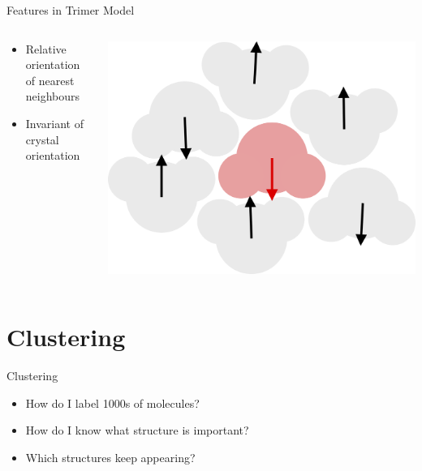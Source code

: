 \documentclass[aspectratio=169, 14pt]{beamer}
\begin{document}
\begin{frame}{Features in Trimer Model}

  \begin{columns}
    \begin{column}{0.5\textwidth}
      \begin{itemize}
        \item Relative orientation of nearest neighbours
        \item Invariant of crystal orientation
      \end{itemize}
    \end{column}
    \begin{column}{0.5\textwidth}
      \includegraphics[width=\textwidth]{orientations.png}
    \end{column}
  \end{columns}
\end{frame}


\section{Clustering}
\begin{frame}{Clustering}

  \begin{itemize}
    \item How do I label 1000s of molecules?
    \item How do I know what structure is important?
    \item Which structures keep appearing?
  \end{itemize}

\end{frame}
\end{document}

